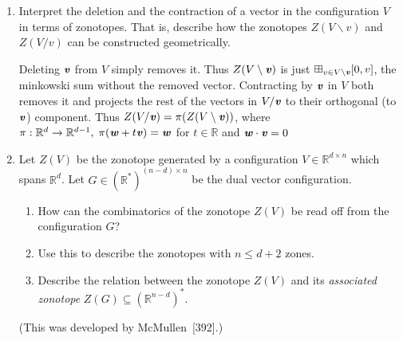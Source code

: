 \documentclass{article}
\begin{document}
\begin{enumerate}
\begin{proof}
    First consider $\aff(F)$, the 2-dimensional affine hull of $F$. We take two vectors $f_1, f_2$ which span this space. Then, consider the normal cone $N_P(F)$, and take an inward normal vector "exclusive" to $F$ (so it is not also the inward normal vector of some larger face containing $F$). Equivalently, consider the set of all all facets $\{F_i\}$ containing $F$, and take a positive combination of their inward normal vectors $n_i$, as in $v = \sum_{i} \lambda_ix_i, \; \lambda_i > 0$. In this case we see that projection to the 3-dimensional subspace spanned by $f_1, f_2$ and $v$, the non-zonotopal face $F$ remains a face of the projected polytope, and thus we are done.

    For a counterexample for projections to $\mathbb{R}^2$, note that every projection of a octahedron is a zonotope. In fact, we can write the octahedron as $\conv(\pm e_1, \pm e_2, \pm e_3)$, and thus for any projection $\pi: \mathbb{R}^3 \to \mathbb{R}^2$ we obtain the zonotope $\boxplus_{i=1}^3 [\pi(-e_i), \pi(e_i)]$
\end{proof}

\item Interpret the deletion and the contraction of a vector in the configuration $V$ in terms of zonotopes. That is, describe how the zonotopes $Z(V\backslash v)$ and $Z(V/v)$ can be constructed geometrically.

\begin{solution}
    Deleting $\textbf{\textit{v}}$ from $V$ simply removes it. Thus $Z(V\setminus\textbf{\textit{v}})$ is just $\boxplus_{v \in V \setminus\textbf{\textit{v}}}[0,v]$, the minkowski sum without the removed vector. Contracting by $\textbf{\textit{v}}$ in $V$ both removes it and projects the rest of the vectors in $V/\textbf{\textit{v}}$ to their orthogonal (to $\textbf{\textit{v}}$) component. Thus $Z(V/\textbf{\textit{v}}) = \pi(Z(V\setminus \textbf{\textit{v}}))$, where $\pi: \mathbb{R}^d \to \mathbb{R}^{d-1}, \; \pi(\textbf{\textit{w}} + t\textbf{\textit{v}}) = \textbf{\textit{w}}$ for $t \in \mathbb{R}$ and $\textbf{\textit{w}} \cdot \textbf{\textit{v}} = 0$
\end{solution}

\item Let $Z(V)$ be the zonotope generated by a configuration $V \in \mathbb{R}^{d\times n}$ which spans $\mathbb{R}^d$. Let $G \in (\mathbb{R}^*)^{(n-d)\times n}$ be the dual vector configuration.

\begin{enumerate}[label=(\roman*)]
\item How can the combinatorics of the zonotope $Z(V)$ be read off from the configuration $G$?
\item Use this to describe the zonotopes with $n \le d+2$ zones.
\item Describe the relation between the zonotope $Z(V)$ and its \emph{associated zonotope} $Z(G)\subseteq (\mathbb{R}^{n-d})^*$.
\end{enumerate}
(This was developed by McMullen~[392].)


\end{enumerate}
\end{document}
